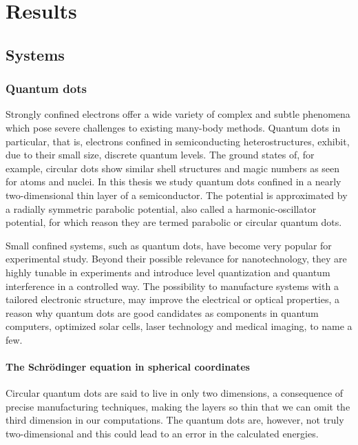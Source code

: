 \part{Results}



\clearpage
{}
{}




\chapter{Systems}


\section{Quantum dots}
Strongly confined electrons offer a wide variety of complex and subtle phenomena which pose severe  challenges to existing many-body methods.
Quantum dots in particular, that is, electrons confined in semiconducting heterostructures, exhibit, due to their small size, discrete quantum levels. 
The ground states of, for example, circular dots show similar shell structures and magic numbers as seen for atoms and nuclei.
In this thesis we study quantum dots confined in a nearly two-dimensional thin layer of a semiconductor.
The potential is approximated by a radially symmetric parabolic potential, also called a harmonic-oscillator potential, for which reason they are termed parabolic or circular quantum dots.

Small confined systems, such as quantum dots, have become very popular for experimental 
study. 
Beyond their possible relevance for nanotechnology, they are highly tunable in experiments and introduce level quantization and quantum interference in a controlled way. 
The possibility to manufacture systems with a tailored electronic structure, may improve the electrical or optical properties, a reason why quantum dots are good candidates as components in quantum computers, optimized solar cells, laser technology and medical imaging, to name a few.



\subsection{The Schrödinger equation in spherical coordinates}
Circular quantum dots are said to live in only two dimensions, a consequence of precise manufacturing techniques, making the layers so thin that we can omit the third dimension in our computations.
The quantum dots are, however, not truly two-dimensional and this could lead to an error in the calculated energies.

